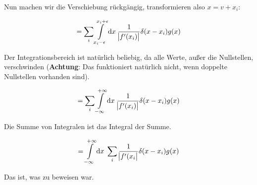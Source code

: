 \documentclass[a4paper,german,12pt,smallheadings]{scrartcl}
\begin{document}
Nun machen wir die Verschiebung rückgängig, transformieren also $x = v + x_i$:

\begin{equation}
  = \sum_{i} \int\limits_{x_i - \epsilon}^{x_i + \epsilon} \dif x \; \frac{1}{\envert{f'(x_i)}} \delta(x - x_i) g(x)
\end{equation}

Der Integrationsbereich ist natürlich beliebig, da alle Werte, außer die
Nullstellen, verschwinden (\textbf{Achtung}: Das funktioniert natürlich nicht,
wenn doppelte Nullstellen vorhanden sind).


\begin{equation}
  = \sum_{i} \int\limits_{- \infty}^{+ \infty} \dif x \; \frac{1}{\envert{f'(x_i)}} \delta(x - x_i) g(x)
\end{equation}

Die Summe von Integralen ist das Integral der Summe.

\begin{equation}
  = \int\limits_{- \infty}^{+ \infty} \dif x \; \sum_i \frac{1}{\envert{f'(x_i}} \delta(x - x_i) g(x)
\end{equation}

Das ist, was zu beweisen war.
\end{document}
